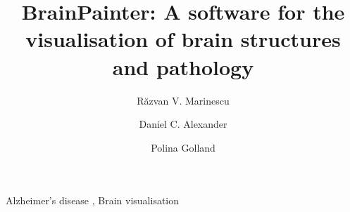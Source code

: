 \documentclass[final,5p,times,twocolumn,authoryear]{elsarticle}
\begin{document}
\begin{frontmatter}



\title{BrainPainter: A software for the visualisation of brain structures and pathology}




\address[ucl]{Centre for Medical Image Computing, University College London, Gower Street, London, United Kingdom, WC1E 6BT}
\address[mit]{Computer Science and Artificial Intelligence Laboratory, Massachusetts Institute of Technology, Cambridge, USA, MA 02139}


\author[ucl,mit]{R\u{a}zvan V. Marinescu}
\author[ucl]{Daniel C. Alexander}
\author[mit]{Polina Golland}





\begin{abstract}


\end{abstract}

\begin{keyword}
Alzheimer's disease \sep 
Brain visualisation
\end{keyword}

\end{frontmatter}
\end{document}
